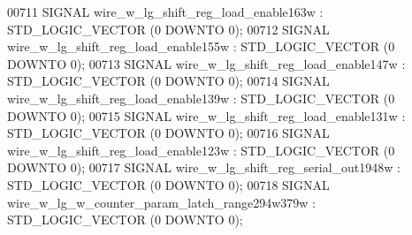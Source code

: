 \begin{DoxyCode}
{00711      \textcolor{keywordflow}{SIGNAL}  \textcolor{vhdlchar}{wire_w_lg_shift_reg_load_enable163w}    \textcolor{vhdlchar}{:}   \textcolor{comment}{STD\_LOGIC\_VECTOR} \textcolor{vhdlchar}{(}\textcolor{vhdllogic}{}\textcolor{vhdllogic}{0} \textcolor{keywordflow}{DOWNTO} \textcolor{vhdllogic}{}\textcolor{vhdllogic}{0}\textcolor{vhdlchar}{)};
00712      \textcolor{keywordflow}{SIGNAL}  \textcolor{vhdlchar}{wire_w_lg_shift_reg_load_enable155w}    \textcolor{vhdlchar}{:}   \textcolor{comment}{STD\_LOGIC\_VECTOR} \textcolor{vhdlchar}{(}\textcolor{vhdllogic}{}\textcolor{vhdllogic}{0} \textcolor{keywordflow}{DOWNTO} \textcolor{vhdllogic}{}\textcolor{vhdllogic}{0}\textcolor{vhdlchar}{)};
00713      \textcolor{keywordflow}{SIGNAL}  \textcolor{vhdlchar}{wire_w_lg_shift_reg_load_enable147w}    \textcolor{vhdlchar}{:}   \textcolor{comment}{STD\_LOGIC\_VECTOR} \textcolor{vhdlchar}{(}\textcolor{vhdllogic}{}\textcolor{vhdllogic}{0} \textcolor{keywordflow}{DOWNTO} \textcolor{vhdllogic}{}\textcolor{vhdllogic}{0}\textcolor{vhdlchar}{)};
00714      \textcolor{keywordflow}{SIGNAL}  \textcolor{vhdlchar}{wire_w_lg_shift_reg_load_enable139w}    \textcolor{vhdlchar}{:}   \textcolor{comment}{STD\_LOGIC\_VECTOR} \textcolor{vhdlchar}{(}\textcolor{vhdllogic}{}\textcolor{vhdllogic}{0} \textcolor{keywordflow}{DOWNTO} \textcolor{vhdllogic}{}\textcolor{vhdllogic}{0}\textcolor{vhdlchar}{)};
00715      \textcolor{keywordflow}{SIGNAL}  \textcolor{vhdlchar}{wire_w_lg_shift_reg_load_enable131w}    \textcolor{vhdlchar}{:}   \textcolor{comment}{STD\_LOGIC\_VECTOR} \textcolor{vhdlchar}{(}\textcolor{vhdllogic}{}\textcolor{vhdllogic}{0} \textcolor{keywordflow}{DOWNTO} \textcolor{vhdllogic}{}\textcolor{vhdllogic}{0}\textcolor{vhdlchar}{)};
00716      \textcolor{keywordflow}{SIGNAL}  \textcolor{vhdlchar}{wire_w_lg_shift_reg_load_enable123w}    \textcolor{vhdlchar}{:}   \textcolor{comment}{STD\_LOGIC\_VECTOR} \textcolor{vhdlchar}{(}\textcolor{vhdllogic}{}\textcolor{vhdllogic}{0} \textcolor{keywordflow}{DOWNTO} \textcolor{vhdllogic}{}\textcolor{vhdllogic}{0}\textcolor{vhdlchar}{)};
00717      \textcolor{keywordflow}{SIGNAL}  \textcolor{vhdlchar}{wire_w_lg_shift_reg_serial_out1948w}    \textcolor{vhdlchar}{:}   \textcolor{comment}{STD\_LOGIC\_VECTOR} \textcolor{vhdlchar}{(}\textcolor{vhdllogic}{}\textcolor{vhdllogic}{0} \textcolor{keywordflow}{DOWNTO} \textcolor{vhdllogic}{}\textcolor{vhdllogic}{0}\textcolor{vhdlchar}{)};
00718      \textcolor{keywordflow}{SIGNAL}  \textcolor{vhdlchar}{wire_w_lg_w_counter_param_latch_range294w379w}  \textcolor{vhdlchar}{:}   \textcolor{comment}{STD\_LOGIC\_VECTOR} \textcolor{vhdlchar}{(}\textcolor{vhdllogic}{}\textcolor{vhdllogic}{0} \textcolor{keywordflow}{DOWNTO} \textcolor{vhdllogic}{}\textcolor{vhdllogic}{0}\textcolor{vhdlchar}{)};
}
\end{DoxyCode}
